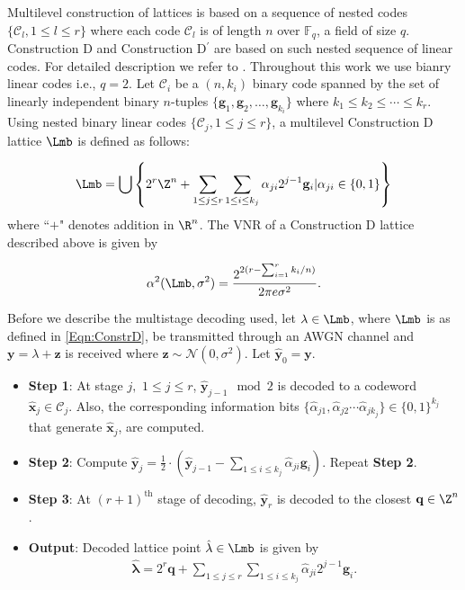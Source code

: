 \documentclass[journal]{IEEEtran}
\begin{document}
		Multilevel construction of lattices is based on a sequence of nested codes $\{\mathcal{C}_{l},1\leq l\leq r\}$ where each code $\mathcal{C}_{l}$ is of length $n$ over $\mathbb{F}_q$, a field of size $q$. Construction D and Construction D$^{\prime}$ are based on such nested sequence of linear codes. For detailed description we refer to \cite{conway1999sphere}. Throughout this work we use bianry linear codes i.e., $q=2$. Let $\mathcal{C}_{i}$ be a $(n,k_i)$ binary code spanned by the set of linearly independent binary $n$-tuples $\{\mathbf{g}_1,\mathbf{g}_2,\ldots,\mathbf{g}_{k_i}\}$ where $k_{1}\leq k_{2}\leq \cdots \leq k_{r}$. Using nested binary linear codes $\{\mathcal{C}_{j},1\leq j\leq r\}$, a multilevel Construction D lattice $\Lmb$ is defined as follows:

\begin{align}\label{Eqn:ConstrD}
 \Lmb=\bigcup \left\{2^{r}\Z^{n}+\sum_{1\leq j\leq r}\sum_{1\leq i\leq k_{j}}\alpha_{ji}2^{j-1}\mathbf{g}_i|\alpha_{ji}\in\{0,1\}\right\}
\end{align}
where ``$+$" denotes addition in $\R^{n}$. The VNR of a Construction D lattice described above is given by

\begin{equation}
    \alpha^{2}(\Lmb,\sigma^{2})=\frac{2^{2(r-\sum_{i=1}^{r}k_{i}/n)}}{2\pi e\sigma^{2}}.
\end{equation}

Before we describe the multistage decoding used, let $\lambda\in\Lmb$, where $\Lmb$ is as defined in \eqref{Eqn:ConstrD}, be transmitted through an AWGN channel and $\mathbf{y}=\lambda+\mathbf{z}$ is received where $\mathbf{z}\sim\mathcal{N}(0,\sigma^{2})$. Let $\hat{\mathbf{y}}_{0}=\mathbf{y}$.

\begin{itemize}
\item \textbf{Step 1}: At stage $j, $ $1\leq j\leq r$, $\hat{\mathbf{y}}_{j-1}\mod 2$ is decoded to a codeword  $\hat{\mathbf{x}}_{j}\in \mathcal{C}_{j}$. Also, the corresponding information bits  $\{\hat{\alpha}_{j1},\hat{\alpha}_{j2}\cdots \hat{\alpha}_{jk_{j}}\}\in \{0,1\}^{k_{j}}$ that generate $\hat{\mathbf{x}}_{j}$, are computed.
\item \textbf{Step 2}: Compute $\hat{\mathbf{y}}_{j}= \frac{1}{2} \cdot(\hat{\mathbf{y}}_{j-1}-\sum_{1\leq i\leq k_{j}}\hat{\alpha}_{ji}\mathbf{g}_i)$. Repeat \textbf{Step 2}.
\item \textbf{Step 3}: At $(r+1)^{\text{th}}$ stage of decoding, $\hat{\mathbf{y}}_{r}$ is decoded to the closest $\mathbf{q}\in\Z^{n}$.
\item \textbf{Output}: Decoded lattice point $\hat{\mathbf{\lambda}}\in\Lmb$ is given by
\begin{align}
    \hat{\mathbf{\lambda}}=2^{r}\mathbf{q}+\sum_{1\leq j\leq r}\sum_{1\leq i\leq k_{j}}\hat{\alpha}_{ji}2^{j-1}\mathbf{g}_i.
\end{align}

\end{itemize}
\end{document}
